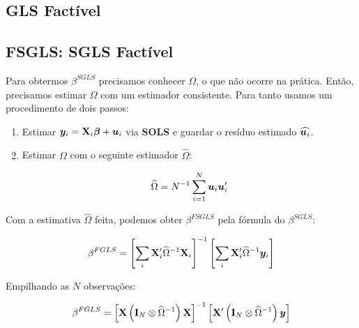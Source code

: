 \documentclass[11pt, oneside, a4paper, article]{article}
\numberwithin{equation}{section}
\begin{document}
\begin{description}
\section{GLS Factível}

\noindent
\citet[Sec.7.5 -- Feasible GLS, p.153]{wool-2010} 

\subsection{FSGLS: SGLS Factível}

Para obtermos $\beta^{SGLS}$ precisamos conhecer $\Omega$, o que não ocorre na prática.
Então, precisamos estimar $\Omega$ com um estimador consistente.
Para tanto usamos um procedimento de dois passos:

\begin{enumerate}
\item  %
Estimar $\boldsymbol{y}_{i} = \mathbf{X}_{i} \boldsymbol{\beta} + \boldsymbol{u}_{i}$ via \textbf{SOLS} e guardar o resíduo estimado $\widehat{\boldsymbol{u}_{i}}$.

\item  %
Estimar $\Omega$ com o seguinte estimador $\widehat{\Omega}$:

\vspace{-1.5 em}
\begin{align*}
	\widehat{\Omega} 
	= 
	N^{-1} \sum_{i=1}^{N} \boldsymbol{u}_{i} \boldsymbol{u}_{i}'
\end{align*}
\end{enumerate}

Com a estimativa $\widehat{\Omega}$ feita, podemos obter $\beta^{FSGLS}$ pela fórmula do $\beta^{SGLS}$:

\vspace{-1.5 em}
\begin{align*}
	\beta^{FGLS}
	= 
	\left[ 
		\sum_{i} \mathbf{X}_{i}' \widehat{\Omega}^{-1} \mathbf{X}_{i}
	\right]^{-1}
	\left[ 
		\sum_{i} \mathbf{X}_{i}' \widehat{\Omega}^{-1} \boldsymbol{y}_{i}
	\right]
\end{align*}

Empilhando as $N$ observações:

\vspace{-1.5 em}
\begin{align*}
\beta^{FGLS}
= 
\left[ \mathbf{X} \left( \mathbf{I}_{N} \otimes \widehat{\Omega}^{-1} \right) \mathbf{X} \right]^{-1}
\left[ \mathbf{X}' \left( \mathbf{I}_{N} \otimes \widehat{\Omega}^{-1} \right) \boldsymbol{y} \right]
\end{align*}


\end{description}
\end{document}
